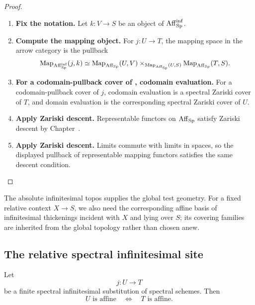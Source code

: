 \begin{proof}
\leavevmode
\begin{enumerate}[label=\textup{(\arabic*)}]
    \item \textbf{Fix the notation.}
    Let \(k:V\to S\) be an object of \(\operatorname{Aff}_{\operatorname{Sp}}^{\inf}\).

    \item \textbf{Compute the mapping object.}
    For \(j:U\to T\), the mapping space in the arrow category is the pullback
    \[
        \operatorname{Map}_{\operatorname{Aff}_{\operatorname{Sp}}^{\inf}}(j,k)
        \simeq
        \operatorname{Map}_{\operatorname{Aff}_{\operatorname{Sp}}}(U,V)
        \times_{\operatorname{Map}_{\operatorname{Aff}_{\operatorname{Sp}}}(U,S)}
        \operatorname{Map}_{\operatorname{Aff}_{\operatorname{Sp}}}(T,S).
    \]

    \item \textbf{For a codomain-pullback cover of , codomain evaluation.}
    For a codomain-pullback cover of \(j\), codomain evaluation is a spectral Zariski
    cover of \(T\), and domain evaluation is the corresponding spectral Zariski cover of
    \(U\).

    \item \textbf{Apply Zariski descent.}
    Representable functors on \(\operatorname{Aff}_{\operatorname{Sp}}\) satisfy Zariski descent by
    Chapter~.

    \item \textbf{Apply Zariski descent.}
    Limits commute with limits in spaces, so the displayed pullback of representable mapping
    functors satisfies the same descent condition.
\end{enumerate}
\end{proof}
The absolute infinitesimal topos supplies the global test geometry. For a
fixed relative context \(X\to S\), we also need the corresponding affine basis
of infinitesimal thickenings incident with \(X\) and lying over \(S\); its
covering families are inherited from the global topology rather than chosen
anew.

\subsection{The relative spectral infinitesimal site}

\begin{lemma}
\label{lem:finite-infinitesimal-affineness-invariance}
Let
\[
    j:U\longrightarrow T
\]
be a finite spectral infinitesimal substitution of spectral schemes. Then
\[
    U\text{ is affine}
    \quad\Longleftrightarrow\quad
    T\text{ is affine}.
\]
\end{lemma}

